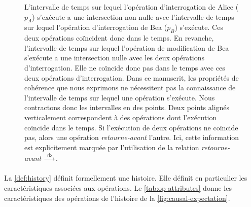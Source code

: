 \begin{figure}[ht]
\caption[Relation retourne-avant d'une histoire]{ L'intervalle de temps sur lequel l'opération d'interrogation de Alice ($p_A$) s'exécute a une intersection non-nulle avec l'intervalle de temps sur lequel l'opération d'interrogation de Bea ($p_B$) s'exécute.
Ces deux opérations coïncident donc dans le temps.
En revanche, l'intervalle de temps sur lequel l'opération de modification de Bea s'exécute a une intersection nulle avec les deux opérations d'interrogation.
Elle ne coïncide donc pas dans le temps avec ces deux opérations d'interrogation.
Dans ce manuscrit, les propriétés de cohérence que nous exprimons ne nécessitent pas la connaissance de l'intervalle de temps sur lequel une opération s'exécute.
 Nous contractons donc les intervalles en des points.
Deux points alignés verticalement correspondent à des opérations dont l'exécution coïncide dans le temps.
Si l'exécution de deux opérations ne coïncide pas, alors une opération \emph{retourne-avant} l'autre.
Ici, cette information est explicitement marquée par l'utilisation de la relation \emph{retourne-avant} $\overset{\mathsf{rb}}{\longrightarrow}$.}\label{fig:rb-example}
\end{figure}

\paragraph{}La \autoref{def:history} définit formellement une histoire.
Elle définit en particulier les caractéristiques associées aux opérations.
Le \autoref{tab:op-attributes} donne les caractéristiques des opérations de l'histoire de la \autoref{fig:causal-expectation}.

